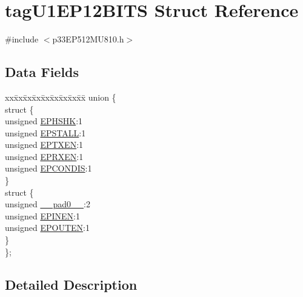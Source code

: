 \hypertarget{structtag_u1_e_p12_b_i_t_s}{}\section{tag\+U1\+E\+P12\+B\+I\+TS Struct Reference}
\label{structtag_u1_e_p12_b_i_t_s}


{\ttfamily \#include $<$p33\+E\+P512\+M\+U810.\+h$>$}

\subsection*{Data Fields}
\begin{DoxyCompactItemize}
\item 
\begin{tabbing}
xx\=xx\=xx\=xx\=xx\=xx\=xx\=xx\=xx\=\kill
union \{\\
\>struct \{\\
\>\>unsigned \hyperlink{structtag_u1_e_p12_b_i_t_s_a0d06430217cb4b189fbe9d0c4b460482}{EPHSHK}:1\\
\>\>unsigned \hyperlink{structtag_u1_e_p12_b_i_t_s_a47042104f04ebe06a23f9789bd400d7e}{EPSTALL}:1\\
\>\>unsigned \hyperlink{structtag_u1_e_p12_b_i_t_s_aa2d88c1be513e759c136823c86a355b4}{EPTXEN}:1\\
\>\>unsigned \hyperlink{structtag_u1_e_p12_b_i_t_s_a8a388d32ceffb87230e660b6793f2857}{EPRXEN}:1\\
\>\>unsigned \hyperlink{structtag_u1_e_p12_b_i_t_s_a1bd26df05d2b5a11b20ee548fce90c3e}{EPCONDIS}:1\\
\>\} \\
\>struct \{\\
\>\>unsigned \hyperlink{structtag_u1_e_p12_b_i_t_s_adf71f3d8410c1f1dbbc96680a92c49af}{\_\_pad0\_\_}:2\\
\>\>unsigned \hyperlink{structtag_u1_e_p12_b_i_t_s_a8b6d98cdf233ac90ff19d16d9a89215e}{EPINEN}:1\\
\>\>unsigned \hyperlink{structtag_u1_e_p12_b_i_t_s_adf87e8acfbb27a5626e21b3e3bd106fd}{EPOUTEN}:1\\
\>\} \\
\}; \\

\end{tabbing}\end{DoxyCompactItemize}


\subsection{Detailed Description}


